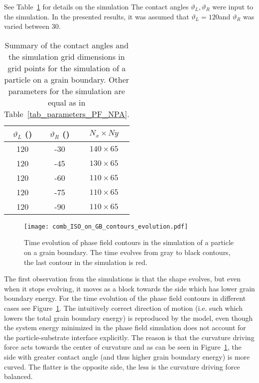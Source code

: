 See Table~\ref{tab_ISO_on_GB_angles} for details on the simulation The contact angles $\vartheta_L,\vartheta_R$ were input to the simulation. In the presented results, it was assumed that $\vartheta_L=120$\textdegree and $\vartheta_R$ was varied between 30\textdegree.

\begin{table}
	\centering
	\caption[PF wetting simulation of a particle with isotropic interface energy ona a GB - contact angles and the simulation grid]{Summary of the contact angles and the simulation grid dimensions in grid points for the simulation of a particle on a grain boundary. Other parameters for the simulation are equal as in Table~\ref{tab_parameters_PF_NPA}.}
	\label{tab_ISO_on_GB_angles}
	\begin{tabular}{c|c|c}
		\hline
		$\vartheta_L$ (\textdegree) & $\vartheta_R$ (\textdegree) & $N_x \times Ny$ \\ \hline
		120 & -30 & $140\times65$ \\
		120 & -45 & $130\times65$ \\
		120 & -60 & $110\times65$ \\
		120 & -75 & $110\times65$ \\
		120 & -90 & $110\times65$ 
	\end{tabular}
\end{table}

\begin{figure}
	\centering
	\texttt{[image: comb\_ISO\_on\_GB\_contours\_evolution.pdf]}
	\caption[Time evolution of phase field contours in the simulation of a particle on a grain boundary]{Time evolution of phase field contours in the simulation of a particle on a grain boundary. The time evolves from gray to black contours, the last contour in the simulation is red.}
	\label{fig_PF_nuclbarrier_ISO_onGB_contours}
\end{figure}

The first observation from the simulations is that the shape evolves, but even when it stops evolving, it moves as a block towards the side which has lower grain boundary energy. For the time evolution of the phase field contours in different cases see Figure~\ref{fig_PF_nuclbarrier_ISO_onGB_contours}. The intuitively correct direction of motion (i.e. such which lowers the total grain boundary energy) is reproduced by the model, even though the system energy minimized in the phase field simulation does not account for the particle-substrate interface explicitly. The reason is that the curvature driving force acts towards the center of curvature and as can be seen in Figure~\ref{fig_PF_nuclbarrier_ISO_onGB_contours}, the side with greater contact angle (and thus higher grain boundary energy) is more curved. The flatter is the opposite side, the less is the curvature driving force balanced. 

